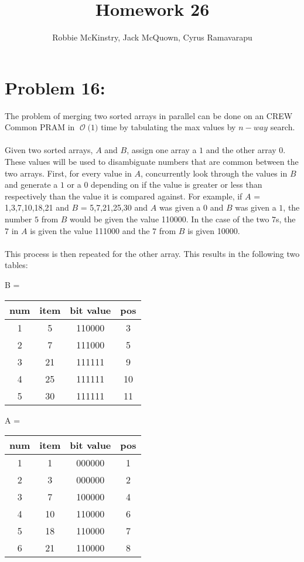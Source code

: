 \documentclass[12pt]{article}
\newcommand{\BigO}[1]{\ensuremath{\operatorname{\mathcal{O}}\bigl(#1\bigr)}}
\begin{document}
\title{Homework 26}
\author{Robbie McKinstry, Jack McQuown, Cyrus Ramavarapu}
\renewcommand{\today}{2 November 2016}
\renewcommand{\baselinestretch}{1.5}
\maketitle

\section*{Problem 16: }
The problem of merging two sorted arrays in parallel can
be done on an CREW Common PRAM in \BigO{1} time by tabulating
the max values by $n-way$ search.\\\\
Given two sorted arrays, $A$ and $B$, assign one array a $1$ and
the other array $0$.  These values will be used to disambiguate
numbers that are common between the two arrays.  First, for every
value in $A$, concurrently look through the values in $B$ and
generate a $1$ or a $0$ depending on if the value is greater or
less than respectively than the value it is compared against.
For example, if $A$ = {1,3,7,10,18,21} and $B$ = {5,7,21,25,30} and
$A$ was given a $0$ and $B$ was given a $1$, the number $5$ from
$B$ would be given the value 110000.  In the case of the two $7$s,
the $7$ in $A$ is given the value 111000 and the $7$ from $B$ is
given 10000.\\\\
This process is then repeated for the other array.  This results 
in the following two tables:\\
\begin{center}
B = 
\begin{tabular}{c|c|c|c}
num & item & bit value & pos \\\hline
1 & 5 & 110000 & 3 \\\hline
2 & 7 & 111000 & 5 \\\hline
3 & 21 & 111111 & 9 \\\hline
4 & 25 & 111111 & 10 \\\hline
5 & 30 & 111111 & 11 \\\hline
\end{tabular}
A = 
\begin{tabular}{c|c|c|c}
num & item & bit value & pos \\\hline
1 & 1 & 000000 & 1 \\\hline
2 & 3 & 000000 & 2 \\\hline
3 & 7 & 100000 & 4 \\\hline
4 & 10 & 110000 & 6 \\\hline
5 & 18 & 110000 & 7 \\\hline
6 & 21 & 110000 & 8 \\\hline
\end{tabular}
\end{center}
\end{document}
